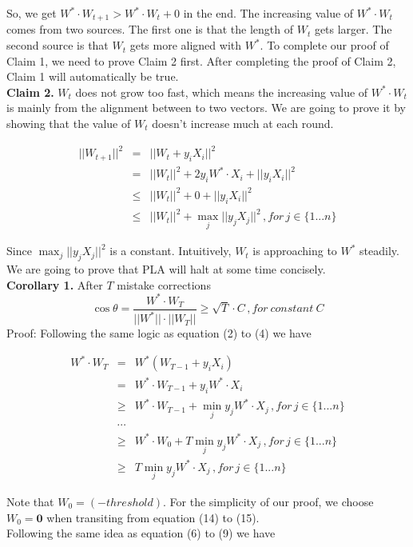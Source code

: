 \documentclass[11pt]{article}
\begin{document}
So, we get $W^* \cdot W_{t+1} > W^* \cdot W_t + 0$ in the end. The increasing value of $W^* \cdot W_t$ comes from two sources. The first one is that the length of $W_t$ gets larger. The second source is that $W_t$ gets more aligned with $W^*$. To complete our proof of Claim 1, we need to prove Claim 2 first. After completing the proof of Claim 2, Claim 1 will automatically be true.
\\
\textbf{Claim 2.} $W_t$ does not grow too fast, which means the increasing value of $W^* \cdot W_t$ is mainly from the alignment between to two vectors. We are going to prove it by showing that the value of $W_t$ doesn't increase much at each round.

\begin{eqnarray}
||W_{t+1}||^2 &=& ||W_t+y_iX_i||^2\\
&=& ||W_{t}||^2 +2y_iW^* \cdot X_i + ||y_iX_i||^2\\
&\leq& ||W_{t}||^2 + 0 + ||y_iX_i||^2\\
&\leq& ||W_{t}||^2 + \max _j ||y_jX_j||^2 \, ,for \,j \in \{1...n\}
\end{eqnarray}

Since $\max _j ||y_jX_j||^2$ is a constant. Intuitively, $W_t$ is approaching to $W^*$ steadily. We are going to prove that PLA will halt at some time concisely.\\

\textbf{Corollary 1.} After $T$ mistake corrections
$$\cos \theta = \frac{W^* \cdot W_T}{||W^*|| \cdot ||W_T||} \geq \sqrt{T} \cdot C \, , for\ constant\ C$$
Proof: Following the same logic as equation (2) to (4) we have

\begin{eqnarray}
W^* \cdot W_{T} &=& W^*(W_{T-1}+y_iX_i)\\
&=& W^*\cdot W_{T-1}+ y_i W^* \cdot X_i\\
&\geq& W^* \cdot W_{T-1} + \min _j y_j W^* \cdot X_j \, ,for \,j \in \{1...n\}\\
&\cdots&\\
&\geq& W^* \cdot W_{0} + T \min _j y_j W^* \cdot X_j \, ,for \,j \in \{1...n\}\\
&\geq& T \min _j y_j W^* \cdot X_j \, ,for \,j \in \{1...n\}
\end{eqnarray}

Note that $W_0 = (-threshold)$. For the simplicity of our proof, we choose $W_0 = \textbf{0}$ when transiting from equation (14) to (15).\\
Following the same idea as equation (6) to (9) we have
\end{document}
